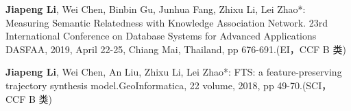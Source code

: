 






\begin{publications}{99}

\item \textbf{Jiapeng Li}, Wei Chen, Binbin Gu, Junhua Fang, Zhixu Li, Lei Zhao*: Measuring Semantic Relatedness with Knowledge Association Network. 23rd International Conference on Database Systems for Advanced Applications DASFAA, 2019, April 22-25, Chiang Mai, Thailand, pp 676-691.(EI，CCF B 类)


\item \textbf{Jiapeng Li}, Wei Chen, An Liu, Zhixu Li, Lei Zhao*: FTS: a feature-preserving trajectory synthesis model.GeoInformatica, 22 volume, 2018, pp 49-70.(SCI，CCF B 类)

\end{publications}

